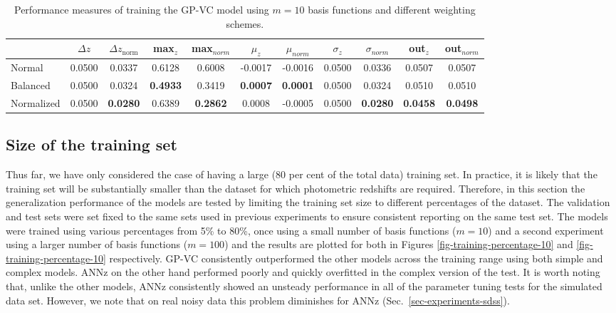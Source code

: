 \documentclass[useAMS,usenatbib,fleqn]{mn2e}
\begin{document}
 \begin{table}
\caption{Performance measures of training the GP-VC model using $m=10$ basis functions and different weighting schemes.}
\begin{center}
\begin{tabular}{| l | c | c |  c | c |  c | c |  c | c |  c | c | }
     				&	$\Delta z$	&	$\Delta z_\textrm{norm}$	&	max$_{z}$ & max$_{norm}$		&	$\mu_{z}$&	$\mu_{norm}$	& $\sigma_{z}$ & $\sigma_{norm}$ & out$_{z}$&out$_{norm}$\\	\hline
	Normal		&	0.0500	&	0.0337		&	0.6128		&	0.6008&	-0.0017		&	-0.0016&	0.0500		&	0.0336&	0.0507		&	0.0507\\
	Balanced		&	0.0500 	&	0.0324		&	\textbf{0.4933}	&	0.3419&	\textbf{0.0007}		&	\textbf{0.0001}&	0.0500		&	0.0324&	0.0510 	&	0.0510	\\
	Normalized	&	0.0500 	&	\textbf{0.0280}	&	0.6389		&	\textbf{0.2862}&	0.0008			&	-0.0005&	0.0500		&	\textbf{0.0280}&	\textbf{0.0458}	&	\textbf{0.0498	}\\\hline
  \end{tabular}
\end{center}
\label{table-normal-balanced}
\end{table}

\subsection{Size of the training set}
\label{sec-sizetraining}

Thus far, we have only considered the case of having a large (80 per cent of the total data) training set. In practice, it is likely that the training set will be substantially smaller than the dataset for which photometric redshifts are required. Therefore, in this section the generalization performance of the models are tested by limiting the training set size to different percentages of the dataset. The validation and test sets were set fixed to the same sets used in previous experiments to ensure consistent reporting on the same test set. The models were trained using various percentages from 5\% to 80\%, once using a small number of basis functions ($m=10$) and a second experiment using a larger number of basis functions ($m=100$) and the results are plotted for both in Figures \ref{fig-training-percentage-10} and \ref{fig-training-percentage-10} respectively. GP-VC consistently outperformed the other models across the training range using both simple and complex models. {ANNz} on the other hand performed poorly and quickly overfitted in the complex version of the test. It is worth noting that, unlike the other models, {ANNz} consistently showed an unsteady performance in all of the parameter tuning tests for the simulated data set. However, we note that on real noisy data this problem diminishes for ANNz (Sec.~\ref{sec-experiments-sdss}).
\end{document}
